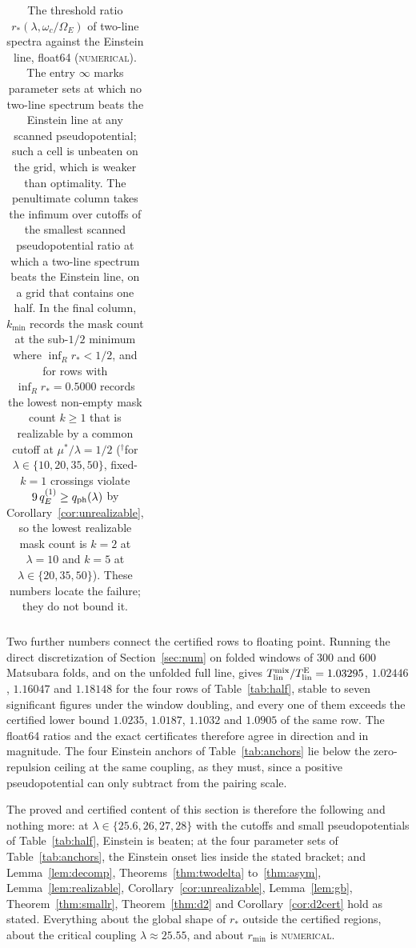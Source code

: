 \documentclass[11pt]{article}
\newcommand{\Tlin}{T_{\mathrm{lin}}}
\newcommand{\OmE}{\Omega_E}
\newcommand{\muS}{\mu^{*}}
\theoremstyle{definition}
\theoremstyle{remark}
\begin{document}
\begin{table}[t]
\begin{tabular}{@{}rrrrrrrrrrrr@{}}
\bottomrule
\end{tabular}
\caption{The threshold ratio $r_*(\lambda,\omega_c/\OmE)$ of two-line spectra against the
Einstein line, float64 (\textsc{numerical}). The entry $\infty$ marks parameter sets at
which no two-line spectrum beats the Einstein line at any scanned pseudopotential; such a
cell is unbeaten on the grid, which is weaker than optimality. The penultimate column takes
the infimum over cutoffs of the smallest scanned pseudopotential ratio at which a two-line
spectrum beats the Einstein line, on a grid that contains one half. In the final column,
$k_{\min}$ records the mask count at the sub-$1/2$ minimum where $\inf_R r_*<1/2$, and for
rows with $\inf_R r_*=0.5000$ records the lowest non-empty mask count $k\ge1$ that is
realizable by a common cutoff at $\muS/\lambda=1/2$ ($^\dagger$for $\lambda\in\{10,20,35,50\}$,
fixed-$k=1$ crossings violate $9\,q_E^{(1)}\ge q_{\rm ph}(\lambda)$ by
Corollary~\ref{cor:unrealizable}, so the lowest realizable mask count is $k=2$ at
$\lambda=10$ and $k=5$ at $\lambda\in\{20,35,50\}$). These numbers locate the failure; they
do not bound it.}
\label{tab:phase}
\end{table}

Two further numbers connect the certified rows to floating point. Running the direct
discretization of Section~\ref{sec:num} on folded windows of $300$ and $600$ Matsubara
folds, and on the unfolded full line, gives $\Tlin^{\rm mix}/\Tlin^{\rm E}=1.03295$,
$1.02446$, $1.16047$ and $1.18148$ for the four rows of Table~\ref{tab:half}, stable to
seven significant figures under the window doubling, and every one of them exceeds the
certified lower bound $1.0235$, $1.0187$, $1.1032$ and $1.0905$ of the same row. The
float64 ratios and the exact certificates therefore agree in direction and in magnitude.
The four Einstein anchors of Table~\ref{tab:anchors} lie below the zero-repulsion ceiling
at the same coupling, as they must, since a positive pseudopotential can only subtract
from the pairing scale.

The proved and certified content of this section is therefore the following and nothing
more: at $\lambda\in\{25.6,26,27,28\}$ with the cutoffs and small pseudopotentials of
Table~\ref{tab:half}, Einstein is beaten; at the four parameter sets of
Table~\ref{tab:anchors}, the Einstein onset lies inside the stated bracket; and
Lemma~\ref{lem:decomp}, Theorems~\ref{thm:twodelta} to~\ref{thm:asym},
Lemma~\ref{lem:realizable}, Corollary~\ref{cor:unrealizable}, Lemma~\ref{lem:gb},
Theorem~\ref{thm:smallr}, Theorem~\ref{thm:d2} and Corollary~\ref{cor:d2cert} hold as
stated. Everything about the global shape of $r_*$ outside the certified regions, about the
critical coupling $\lambda\approx25.55$, and about $r_{\min}$ is \textsc{numerical}.
\end{document}
